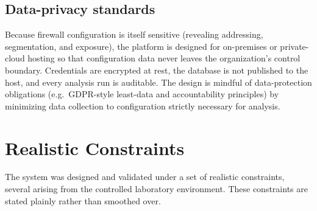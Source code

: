 \subsection{Data-privacy standards}
Because firewall configuration is itself sensitive (revealing addressing, segmentation, and exposure), the platform is designed for on-premises or private-cloud hosting so that configuration data never leaves the organization's control boundary. Credentials are encrypted at rest, the database is not published to the host, and every analysis run is auditable. The design is mindful of data-protection obligations (e.g.\ GDPR-style least-data and accountability principles) by minimizing data collection to configuration strictly necessary for analysis.

\section{Realistic Constraints}
\label{sec:ch1-constraints}

The system was designed and validated under a set of realistic constraints, several arising from the controlled laboratory environment. These constraints are stated plainly rather than smoothed over.

